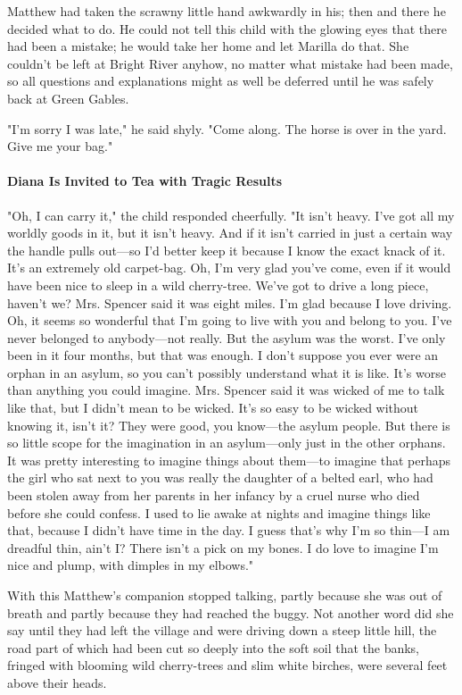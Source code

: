 \documentclass{article}
\begin{document}
Matthew had taken the scrawny little hand awkwardly in his; then and there he decided what to do. He could not tell this child with the glowing eyes that there had been a mistake; he would take her home and let Marilla do that. She couldn't be left at Bright River anyhow, no matter what mistake had been made, so all questions and explanations might as well be deferred until he was safely back at Green Gables.

"I'm sorry I was late," he said shyly. "Come along. The horse is over in the yard. Give me your bag."

\paragraph{Diana Is Invited to Tea with Tragic Results}
"Oh, I can carry it," the child responded cheerfully. "It isn't heavy. I've got all my worldly goods in it, but it isn't heavy. And if it isn't carried in just a certain way the handle pulls out---so I'd better keep it because I know the exact knack of it. It's an extremely old carpet-bag. Oh, I'm very glad you've come, even if it would have been nice to sleep in a wild cherry-tree. We've got to drive a long piece, haven't we? Mrs. Spencer said it was eight miles. I'm glad because I love driving. Oh, it seems so wonderful that I'm going to live with you and belong to you. I've never belonged to anybody---not really. But the asylum was the worst. I've only been in it four months, but that was enough. I don't suppose you ever were an orphan in an asylum, so you can't possibly understand what it is like. It's worse than anything you could imagine. Mrs. Spencer said it was wicked of me to talk like that, but I didn't mean to be wicked. It's so easy to be wicked without knowing it, isn't it? They were good, you know---the asylum people. But there is so little scope for the imagination in an asylum---only just in the other orphans. It was pretty interesting to imagine things about them---to imagine that perhaps the girl who sat next to you was really the daughter of a belted earl, who had been stolen away from her parents in her infancy by a cruel nurse who died before she could confess. I used to lie awake at nights and imagine things like that, because I didn't have time in the day. I guess that's why I'm so thin---I am dreadful thin, ain't I? There isn't a pick on my bones. I do love to imagine I'm nice and plump, with dimples in my elbows."

With this Matthew's companion stopped talking, partly because she was out of breath and partly because they had reached the buggy. Not another word did she say until they had left the village and were driving down a steep little hill, the road part of which had been cut so deeply into the soft soil that the banks, fringed with blooming wild cherry-trees and slim white birches, were several feet above their heads.
\end{document}
